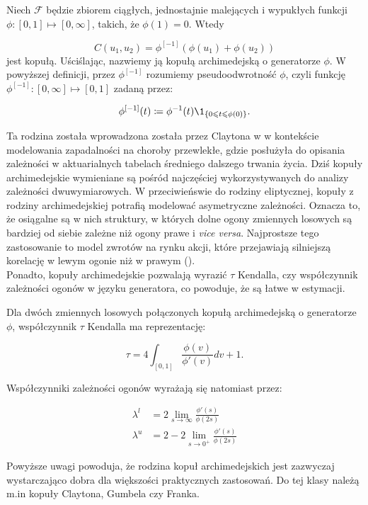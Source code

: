\begin{df}
		Niech $\mathcal{F}$ będzie zbiorem ciągłych, jednostajnie malejących i wypukłych funkcji $\phi \colon [0,1] \mapsto [0, \infty]$, takich, że $\phi(1) = 0$. Wtedy
		
		$$ C(u_1, u_2) = \phi^{[-1]}(\phi(u_1)+\phi(u_2))$$
		jest kopułą. Uściślając, nazwiemy ją kopułą archimedejską o generatorze $\phi$. W powyższej definicji, przez $\phi^{[-1]}$ rozumiemy pseudoodwrotność $\phi$, czyli funkcję $\phi^{[-1]}\colon [0, \infty] \mapsto [0, 1]$ zadaną przez:
		
		$$ \phi^{[-1]}(t) \coloneqq \phi^{-1}(t) \1_{\{0\leqslant t \leqslant \phi(0)\}}. $$
\end{df}

Ta rodzina została wprowadzona została przez Claytona w \cite{Clayton1972} w kontekście modelowania zapadalności na choroby przewlekłe, gdzie posłużyła do opisania zależności w aktuarialnych tabelach średniego dalszego trwania życia. Dziś kopuły archimedejskie wymieniane są pośród najczęściej wykorzystywanych do analizy zależności dwuwymiarowych. W przeciwieńswie do rodziny eliptycznej, kopuły z rodziny archimedejskiej potrafią modelować asymetryczne zależności. Oznacza to, że osiągalne są w nich struktury, w których dolne ogony zmiennych losowych są bardziej od siebie zależne niż ogony prawe i \emph{vice versa}. Najprostsze tego zastosowanie to model zwrotów na rynku akcji, które przejawiają silniejszą korelację w lewym ogonie niż w prawym (\cite{AssymetricEquityDependency}). \\
Ponadto, kopuły archimedejskie pozwalają wyrazić $\tau$ Kendalla, czy współczynnik zależności ogonów w języku generatora, co powoduje, że są łatwe w estymacji.

\begin{prop}
	Dla dwóch zmiennych losowych połączonych kopułą archimedejską o generatorze $\phi$, współczynnik $\tau$ Kendalla ma reprezentację:
	
	$$ \tau = 4\int_{[0, 1]}\frac{\phi(v)}{\phi'(v)}dv + 1.$$
	
	Współczynniki zależności ogonów wyrażają się natomiast przez:
	
	\begin{equation}
		\begin{split}
		\lambda^{l}&=2\lim\limits_{s\to\infty}\frac{\phi'(s)}{\phi(2s)} \\
		\lambda^{u}&=2-2\lim\limits_{s\to0^{+}}\frac{\phi'(s)}{\phi(2s)}
		\end{split}
	\end{equation}
\end{prop}
Powyższe uwagi powoduja, że rodzina kopuł archimedejskich jest zazwyczaj wystarczająco dobra dla większości praktycznych zastosowań. Do tej klasy należą m.in kopuły Claytona, Gumbela czy Franka.


